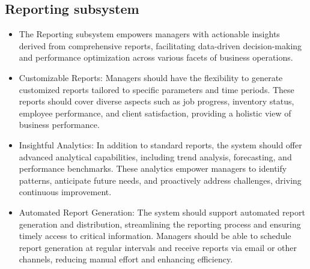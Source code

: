 \documentclass{article}
\begin{document}
\subsection*{Reporting subsystem}	
\begin{itemize}
    \item The Reporting subsystem empowers managers with actionable insights derived from comprehensive reports, facilitating data-driven decision-making and performance optimization across various facets of business operations.
    \item Customizable Reports: Managers should have the flexibility to generate customized reports tailored to specific parameters and time periods. These reports should cover diverse aspects such as job progress, inventory status, employee performance, and client satisfaction, providing a holistic view of business performance.
    \item Insightful Analytics: In addition to standard reports, the system should offer advanced analytical capabilities, including trend analysis, forecasting, and performance benchmarks. These analytics empower managers to identify patterns, anticipate future needs, and proactively address challenges, driving continuous improvement.
    \item Automated Report Generation: The system should support automated report generation and distribution, streamlining the reporting process and ensuring timely access to critical information. Managers should be able to schedule report generation at regular intervals and receive reports via email or other channels, reducing manual effort and enhancing efficiency.
\end{itemize}
\end{document}
